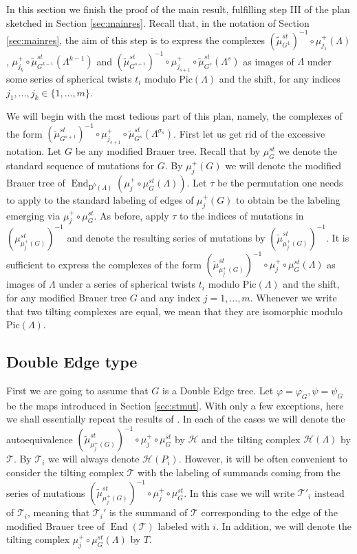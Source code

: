 \documentclass[12pt]{amsart}
\theoremstyle{plain}
\theoremstyle{remark}
\theoremstyle{definition}
\newcommand{\End}{\mathop{\mathrm{End}}\nolimits}
\newcommand{\Pic}{{\mathrm{Pic}}}
\newcommand{\D}{{\mathrm{D}}}
\begin{document}
 In this section we finish the proof of the main result, fulfilling step III of the plan sketched in Section \ref{sec:mainres}. Recall that, in the notation of Section \ref{sec:mainres}, the aim of this step is to express the complexes $(\widetilde{\mu}_{G^1}^{st})^{-1} \circ \mu_{j_1}^+(\Lambda)$, $\mu_{j_k}^+ \circ \widetilde{\mu}_{G^{k-1}}^{st}(\Lambda^{k-1})$ and $(\widetilde{\mu}_{G^{s+1}}^{st})^{-1} \circ \mu_{j_{s+1}}^+ \circ \widetilde{\mu}_{G^s}^{st}(\Lambda^s)$ as images of $\Lambda$ under some series of spherical twists $t_i$ modulo $\Pic(\Lambda)$ and the shift, for any indices $j_1, \dots, j_k \in \{1, \dots, m\}$.  
 
 
 
We will begin with the most tedious part of this plan, namely, the complexes of the form $(\widetilde{\mu}_{G^{s+1}}^{st})^{-1} \circ \mu_{j_{s+1}}^+ \circ \widetilde{\mu}_{G^s}^{st}(\Lambda^{\sigma_s})$. First let us get rid of the excessive notation. Let $G$ be any modified Brauer tree. Recall that by $\mu_G^{st}$ we denote the standard sequence of mutations for $G$. By $\mu_j^+(G)$ we will denote the modified Brauer tree of $\End_{\D^b(\Lambda)}(\mu_j^+ \circ \mu_G^{st}(\Lambda))$. Let $\tau$ be the permutation one needs to apply to the standard labeling of edges of $\mu_j^+(G)$ to obtain be the labeling emerging via $\mu_j^+ \circ \mu_G^{st}$. As before, apply $\tau$ to the indices of mutations in $(\mu_{\mu_j^+(G)}^{st})^{-1}$ and denote the resulting series of mutations by $(\widetilde{\mu}_{\mu_j^+(G)}^{st})^{-1}$. It is sufficient to express the complexes of the form $(\widetilde{\mu}_{\mu_j^+(G)}^{st})^{-1} \circ \mu_j^+ \circ \mu_G^{st}(\Lambda)$ as images of $\Lambda$ under a series of spherical twists $t_i$ modulo $\Pic(\Lambda)$ and the shift, for any modified Brauer tree $G$ and any index $j = 1, \dots, m$. Whenever we write that two tilting complexes are equal, we mean that they are isomorphic modulo $\Pic(\Lambda)$. 

\subsection{Double Edge type}
First we are going to assume that $G$ is a Double Edge tree. Let $\varphi = \varphi_G, \psi = \psi_G$ be the maps introduced in Section \ref{sec:stmut}. With only a few exceptions, here we shall essentially repeat the results of \cite{Alexandra}. In each of the cases we will denote the autoequivalence $(\widetilde{\mu}_{\mu_j^+(G)}^{st})^{-1} \circ \mu_j^+ \circ \mu_G^{st}$ by $\mathcal{H}$ and the tilting complex $\mathcal{H}(\Lambda)$ by $\mathcal{T}$. By $\mathcal{T}_i$ we will always denote $\mathcal{H}(P_i)$. However, it will be often convenient to consider the tilting complex $\mathcal{T}$ with the labeling of summands coming from the series of mutations $(\widetilde{\mu}_{\mu_j^+(G)}^{st})^{-1} \circ \mu_j^+ \circ \mu_G^{st}$. In this case we will write $\mathcal{T}'_i$ instead of $\mathcal{T}_i$, meaning that $\mathcal{T}_i'$ is the summand of $\mathcal{T}$ corresponding to the edge of the modified Brauer tree of $\End(\mathcal{T})$ labeled with $i$. In addition, we will denote the tilting complex $\mu_j^+ \circ \mu_G^{st}(\Lambda)$ by $T$. 
\end{document}
